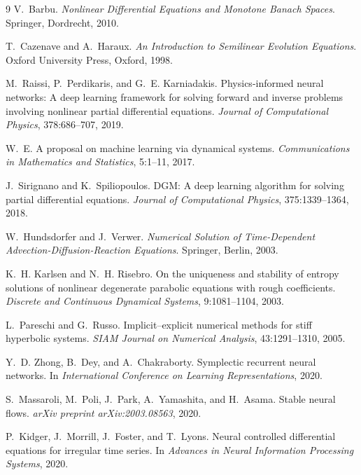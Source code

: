 \documentclass[11pt]{article}
\begin{document}
\begin{thebibliography}{9}
V.~Barbu.
\emph{Nonlinear Differential Equations and Monotone Banach Spaces}.
Springer, Dordrecht, 2010.

T.~Cazenave and A.~Haraux.
\emph{An Introduction to Semilinear Evolution Equations}.
Oxford University Press, Oxford, 1998.

M.~Raissi, P.~Perdikaris, and G.~E. Karniadakis.
Physics-informed neural networks: A deep learning framework for solving forward and inverse problems involving nonlinear partial differential equations.
\emph{Journal of Computational Physics}, 378:686--707, 2019.

W.~E.
A proposal on machine learning via dynamical systems.
\emph{Communications in Mathematics and Statistics}, 5:1--11, 2017.

J.~Sirignano and K.~Spiliopoulos.
DGM: A deep learning algorithm for solving partial differential equations.
\emph{Journal of Computational Physics}, 375:1339--1364, 2018.

W.~Hundsdorfer and J.~Verwer.
\emph{Numerical Solution of Time-Dependent Advection-Diffusion-Reaction Equations}.
Springer, Berlin, 2003.

K.~H. Karlsen and N.~H. Risebro.
On the uniqueness and stability of entropy solutions of nonlinear degenerate parabolic equations with rough coefficients.
\emph{Discrete and Continuous Dynamical Systems}, 9:1081--1104, 2003.

L.~Pareschi and G.~Russo.
Implicit--explicit numerical methods for stiff hyperbolic systems.
\emph{SIAM Journal on Numerical Analysis}, 43:1291--1310, 2005.

Y.~D. Zhong, B.~Dey, and A.~Chakraborty.
Symplectic recurrent neural networks.
In \emph{International Conference on Learning Representations}, 2020.

S.~Massaroli, M.~Poli, J.~Park, A.~Yamashita, and H.~Asama.
Stable neural flows.
\emph{arXiv preprint arXiv:2003.08563}, 2020.

P.~Kidger, J.~Morrill, J.~Foster, and T.~Lyons.
Neural controlled differential equations for irregular time series.
In \emph{Advances in Neural Information Processing Systems}, 2020.


\end{thebibliography}
\end{document}
